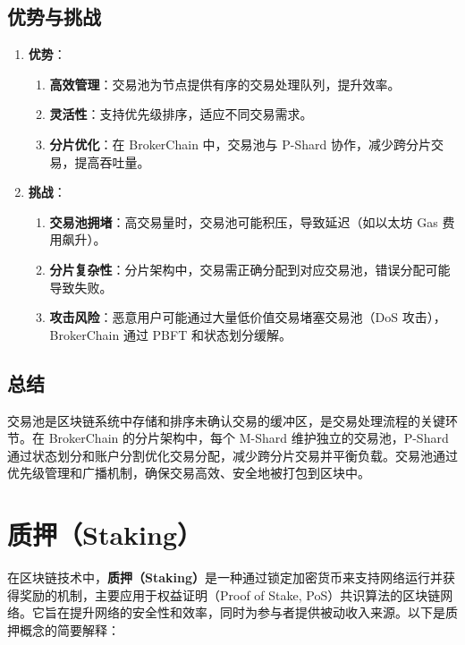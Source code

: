 \documentclass[12pt]{ctexart}
\begin{document}
\subsection{优势与挑战}
\begin{enumerate}
    \item \textbf{优势}：
        \begin{enumerate}
            \item \textbf{高效管理}：交易池为节点提供有序的交易处理队列，提升效率。
            \item \textbf{灵活性}：支持优先级排序，适应不同交易需求。
            \item \textbf{分片优化}：在 BrokerChain 中，交易池与 P-Shard 协作，减少跨分片交易，提高吞吐量。
        \end{enumerate}
    \item \textbf{挑战}：
        \begin{enumerate}
            \item \textbf{交易池拥堵}：高交易量时，交易池可能积压，导致延迟（如以太坊 Gas 费用飙升）。
            \item \textbf{分片复杂性}：分片架构中，交易需正确分配到对应交易池，错误分配可能导致失败。
            \item \textbf{攻击风险}：恶意用户可能通过大量低价值交易堵塞交易池（DoS 攻击），BrokerChain 通过 PBFT 和状态划分缓解。
        \end{enumerate}
\end{enumerate}

\subsection{总结}
交易池是区块链系统中存储和排序未确认交易的缓冲区，是交易处理流程的关键环节。在 BrokerChain 的分片架构中，每个 M-Shard 维护独立的交易池，P-Shard 通过状态划分和账户分割优化交易分配，减少跨分片交易并平衡负载。交易池通过优先级管理和广播机制，确保交易高效、安全地被打包到区块中。

\newpage

\section{质押（Staking）}
在区块链技术中，\textbf{质押（Staking）}是一种通过锁定加密货币来支持网络运行并获得奖励的机制，主要应用于权益证明（Proof of Stake, PoS）共识算法的区块链网络。它旨在提升网络的安全性和效率，同时为参与者提供被动收入来源。以下是质押概念的简要解释：
\end{document}

